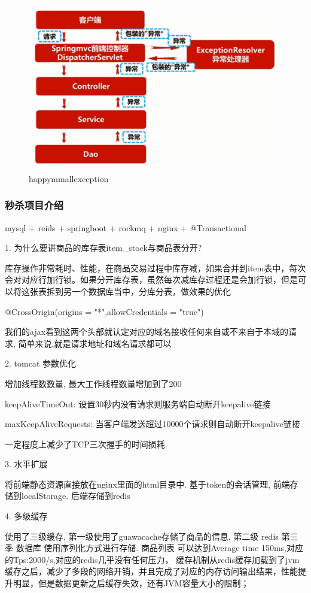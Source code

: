 \begin{figure}
	\centering
	\includegraphics[width=0.7\linewidth]{figures/happymmallexception.png}
	\caption{happymmallexception}
	\label{fig:happymmallexception}
\end{figure}

\subsubsection{秒杀项目介绍}

mysql + reids + springboot + rockmq + nginx + @Transactional

1. 为什么要讲商品的库存表item\_stock与商品表分开?

库存操作非常耗时、性能，在商品交易过程中库存减，如果合并到item表中，每次会对对应行加行锁。如果分开库存表，虽然每次减库存过程还是会加行锁，但是可以将这张表拆到另一个数据库当中，分库分表，做效果的优化


@CrossOrigin(origins = {"*"},allowCredentials = "true")

我们的ajax看到这两个头部就认定对应的域名接收任何来自或不来自于本域的请求, 简单来说,就是请求地址和域名请求都可以

2. tomcat 参数优化

增加线程数数量, 最大工作线程数量增加到了200

keepAliveTimeOut:  设置30秒内没有请求则服务端自动断开keepalive链接

maxKeepAliveRequests: 当客户端发送超过10000个请求则自动断开keepalive链接

一定程度上减少了TCP三次握手的时间损耗.

3. 水平扩展

将前端静态资源直接放在nginx里面的html目录中. 基于token的会话管理, 前端存储到localStorage. 后端存储到redis


4. 多级缓存

使用了三级缓存, 第一级使用了guawacache存储了商品的信息, 第二级 redis 第三季 数据库
使用序列化方式进行存储. 商品列表 可以达到Average time 150ms,对应的Tps:2000/s,对应的redis几乎没有任何压力，
缓存机制从redis缓存加载到了jvm缓存之后，减少了多段的网络开销，并且完成了对应的内存访问输出结果，性能提升明显，但是数据更新之后缓存失效，还有JVM容量大小的限制；

